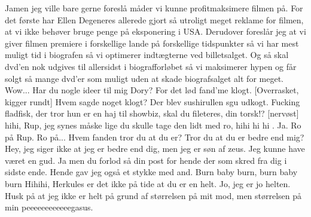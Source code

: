\documentclass[a4paper,11pt]{article}
\begin{document}
\begin{sketch}
 Jamen jeg ville bare gerne foreslå måder vi kunne profitmaksimere filmen på. For det første har Ellen Degeneres allerede gjort så utroligt meget reklame for filmen, at vi ikke behøver bruge penge på eksponering i USA. Derudover foreslår jeg at vi giver filmen premiere i forskellige lande på forskellige tidspunkter så vi har mest muligt tid i biografen så vi optimerer indtægterne ved billetsalget. Og så skal dvd'en nok udgives til allersidst i biografforløbet så vi maksimerer hypen og får solgt så mange dvd'er som muligt uden at skade biografsalget alt for meget.
 Wow... Har du nogle ideer til mig Dory? For det lød fand'me klogt. 
[Overrasket, kigger rundt] Hvem sagde noget klogt?
 Der blev sushirullen sgu udkogt. Fucking fladfisk, der tror hun er en haj til showbiz, skal du fileteres, din torsk!?%
[nervøst] hihi, Rup, jeg synes måske lige du skulle tage den lidt med ro, hihi hi hi .
 Ja. Ro på Rup. Ro på...
  Hvem fanden tror du at du er? Tror du at du er bedre end mig?
 Hey, jeg siger ikke at jeg er bedre end dig, men jeg er søn af zeus. Jeg kunne have været en gud.
 Ja men du forlod så din post for hende der som skred fra dig i sidste ende. Hende gav jeg også et stykke med and. 
 Burn baby burn, burn baby burn  %
 Hihihi, Herkules er det ikke på tide at du er en helt. 
 Jo, jeg er jo helten. Husk på at jeg ikke er helt på grund af størrelsen på mit mod, men størrelsen på min peeeeeeeeeeeegasus. 
\end{sketch}
\end{document}
